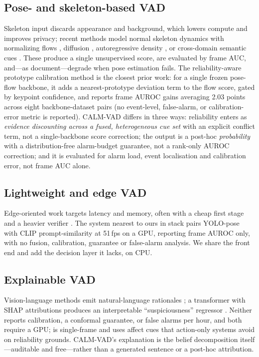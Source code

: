 \documentclass[conference]{IEEEtran}
\newcommand{\method}{CALM-VAD}
\begin{document}
\subsection{Pose- and skeleton-based VAD}
Skeleton input discards appearance and background, which lowers compute and
improves privacy; recent methods model normal skeleton dynamics with
normalizing flows \cite{stgnf2023}, diffusion \cite{graphjigsaw2024},
autoregressive density \cite{seeker2025}, or cross-domain semantic cues
\cite{actionhints2025}. These produce a single unsupervised score, are
evaluated by frame AUC, and---as \cite{poseChallenges2023,bboxtraj2026}
document---degrade when pose estimation fails. The reliability-aware prototype
calibration method \cite{reliabilityproto2026} is the closest prior work: for
a single frozen pose-flow backbone, it adds a nearest-prototype deviation
term to the flow score, gated by keypoint confidence, and reports frame
AUROC gains averaging 2.03 points across eight backbone-dataset pairs (no
event-level, false-alarm, or calibration-error metric is reported).
\method{} differs in three ways: reliability enters as \emph{evidence
discounting across a fused, heterogeneous cue set} with an explicit conflict
term, not a single-backbone score correction; the output is a post-hoc
\emph{probability} with a distribution-free alarm-budget guarantee, not a
rank-only AUROC correction; and it is evaluated for alarm load, event
localisation and calibration error, not frame AUC alone.

\subsection{Lightweight and edge VAD}
Edge-oriented work targets latency and memory, often with a cheap first stage
and a heavier verifier \cite{edgevadsurvey2026,nsvad2024}. The system nearest
to ours in stack \cite{yoloposeclip2026} pairs YOLO-pose with CLIP
prompt-similarity at 51\,fps on a GPU, reporting frame AUROC only, with no
fusion, calibration, guarantee or false-alarm analysis. We share the front end
and add the decision layer it lacks, on CPU.

\subsection{Explainable VAD}
Vision-language methods emit natural-language rationales \cite{vera2025}; a
transformer with SHAP attributions produces an interpretable ``suspiciousness''
regressor \cite{deepusevision2025}. Neither reports calibration, a conformal
guarantee, or false alarms per hour, and both require a GPU;
\cite{deepusevision2025} is single-frame and uses affect cues that
action-only systems avoid on reliability grounds. \method{}'s explanation is
the belief decomposition itself---auditable and free---rather than a generated
sentence or a post-hoc attribution.
\end{document}
